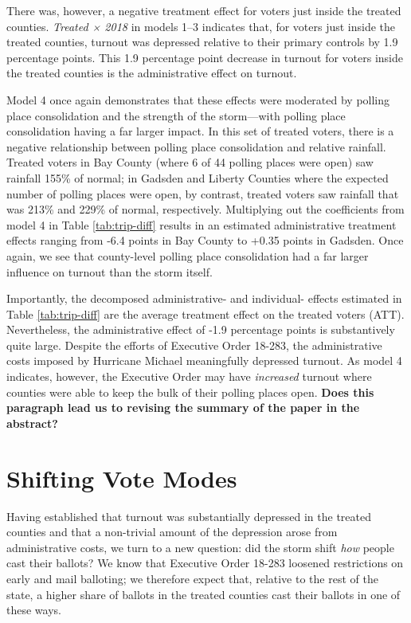 \documentclass[
  12pt,
]{article}
\begin{document}
There was, however, a negative treatment effect for voters just inside the treated counties. \emph{Treated × 2018} in models 1--3 indicates that, for voters just inside the treated counties, turnout was depressed relative to their primary controls by 1.9 percentage points. This 1.9 percentage point decrease in turnout for voters inside the treated counties is the administrative effect on turnout.

Model 4 once again demonstrates that these effects were moderated by polling place consolidation and the strength of the storm---with polling place consolidation having a far larger impact. In this set of treated voters, there is a negative relationship between polling place consolidation and relative rainfall. Treated voters in Bay County (where 6 of 44 polling places were open) saw rainfall 155\% of normal; in Gadsden and Liberty Counties where the expected number of polling places were open, by contrast, treated voters saw rainfall that was 213\% and 229\% of normal, respectively. Multiplying out the coefficients from model 4 in Table \ref{tab:trip-diff} results in an estimated administrative treatment effects ranging from -6.4 points in Bay County to +0.35 points in Gadsden. Once again, we see that county-level polling place consolidation had a far larger influence on turnout than the storm itself.

Importantly, the decomposed administrative- and individual- effects estimated in Table \ref{tab:trip-diff} are the average treatment effect on the treated voters (ATT). Nevertheless, the administrative effect of -1.9 percentage points is substantively quite large. Despite the efforts of Executive Order 18-283, the administrative costs imposed by Hurricane Michael meaningfully depressed turnout. As model 4 indicates, however, the Executive Order may have \emph{increased} turnout where counties were able to keep the bulk of their polling places open. \textbf{Does this paragraph lead us to revising the summary of the paper in the abstract?}

\hypertarget{shifting-vote-modes}{%
\section*{Shifting Vote Modes}\label{shifting-vote-modes}}

Having established that turnout was substantially depressed in the treated counties and that a non-trivial amount of the depression arose from administrative costs, we turn to a new question: did the storm shift \emph{how} people cast their ballots? We know that Executive Order 18-283 loosened restrictions on early and mail balloting; we therefore expect that, relative to the rest of the state, a higher share of ballots in the treated counties cast their ballots in one of these ways.
\end{document}
